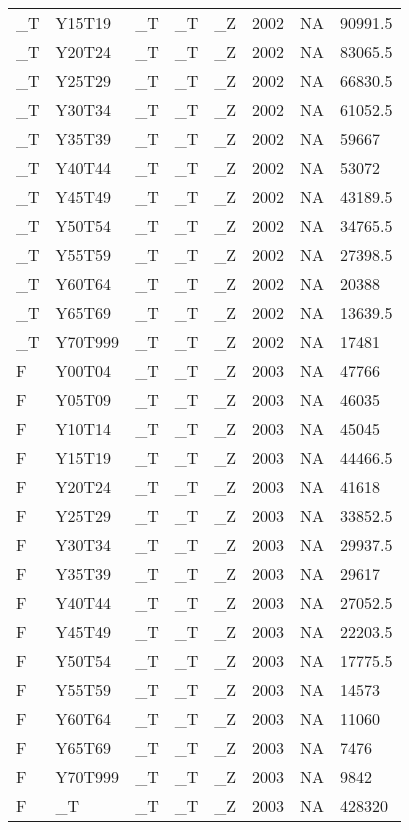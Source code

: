 \begin{longtable}[t]{llllllll}
\_T & Y15T19 & \_T & \_T & \_Z & 2002 & NA & 90991.5\\
\addlinespace
\_T & Y20T24 & \_T & \_T & \_Z & 2002 & NA & 83065.5\\
\_T & Y25T29 & \_T & \_T & \_Z & 2002 & NA & 66830.5\\
\_T & Y30T34 & \_T & \_T & \_Z & 2002 & NA & 61052.5\\
\_T & Y35T39 & \_T & \_T & \_Z & 2002 & NA & 59667\\
\_T & Y40T44 & \_T & \_T & \_Z & 2002 & NA & 53072\\
\addlinespace
\_T & Y45T49 & \_T & \_T & \_Z & 2002 & NA & 43189.5\\
\_T & Y50T54 & \_T & \_T & \_Z & 2002 & NA & 34765.5\\
\_T & Y55T59 & \_T & \_T & \_Z & 2002 & NA & 27398.5\\
\_T & Y60T64 & \_T & \_T & \_Z & 2002 & NA & 20388\\
\_T & Y65T69 & \_T & \_T & \_Z & 2002 & NA & 13639.5\\
\addlinespace
\_T & Y70T999 & \_T & \_T & \_Z & 2002 & NA & 17481\\
F & Y00T04 & \_T & \_T & \_Z & 2003 & NA & 47766\\
F & Y05T09 & \_T & \_T & \_Z & 2003 & NA & 46035\\
F & Y10T14 & \_T & \_T & \_Z & 2003 & NA & 45045\\
F & Y15T19 & \_T & \_T & \_Z & 2003 & NA & 44466.5\\
\addlinespace
F & Y20T24 & \_T & \_T & \_Z & 2003 & NA & 41618\\
F & Y25T29 & \_T & \_T & \_Z & 2003 & NA & 33852.5\\
F & Y30T34 & \_T & \_T & \_Z & 2003 & NA & 29937.5\\
F & Y35T39 & \_T & \_T & \_Z & 2003 & NA & 29617\\
F & Y40T44 & \_T & \_T & \_Z & 2003 & NA & 27052.5\\
\addlinespace
F & Y45T49 & \_T & \_T & \_Z & 2003 & NA & 22203.5\\
F & Y50T54 & \_T & \_T & \_Z & 2003 & NA & 17775.5\\
F & Y55T59 & \_T & \_T & \_Z & 2003 & NA & 14573\\
F & Y60T64 & \_T & \_T & \_Z & 2003 & NA & 11060\\
F & Y65T69 & \_T & \_T & \_Z & 2003 & NA & 7476\\
\addlinespace
F & Y70T999 & \_T & \_T & \_Z & 2003 & NA & 9842\\
F & \_T & \_T & \_T & \_Z & 2003 & NA & 428320\\

\end{longtable}
